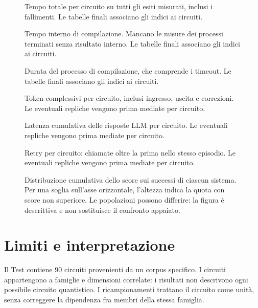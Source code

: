 \begin{figure}[!htbp]\centering

\caption{Tempo totale per circuito su tutti gli esiti misurati, inclusi i fallimenti. Le tabelle finali associano gli indici ai circuiti.}
\end{figure}

\begin{figure}[!htbp]\centering

\caption{Tempo interno di compilazione. Mancano le misure dei processi terminati senza risultato interno. Le tabelle finali associano gli indici ai circuiti.}
\end{figure}

\begin{figure}[!htbp]\centering

\caption{Durata del processo di compilazione, che comprende i timeout. Le tabelle finali associano gli indici ai circuiti.}
\end{figure}

\begin{figure}[!htbp]\centering

\caption{Token complessivi per circuito, inclusi ingresso, uscita e correzioni. Le eventuali repliche vengono prima mediate per circuito.}
\end{figure}

\begin{figure}[!htbp]\centering

\caption{Latenza cumulativa delle risposte LLM per circuito. Le eventuali repliche vengono prima mediate per circuito.}
\end{figure}

\begin{figure}[!htbp]\centering

\caption{Retry per circuito: chiamate oltre la prima nello stesso episodio. Le eventuali repliche vengono prima mediate per circuito.}
\end{figure}

\begin{figure}[!htbp]\centering

\caption{Distribuzione cumulativa dello score sui successi di ciascun sistema. Per una soglia sull’asse orizzontale, l’altezza indica la quota con score non superiore. Le popolazioni possono differire: la figura è descrittiva e non sostituisce il confronto appaiato.}
\end{figure}
\FloatBarrier
\section{Limiti e interpretazione}
Il Test contiene 90 circuiti provenienti da un corpus specifico. I circuiti
appartengono a famiglie e dimensioni correlate: i risultati non descrivono ogni
possibile circuito quantistico. I ricampionamenti trattano il circuito come
unità, senza correggere la dipendenza fra membri della stessa famiglia.

